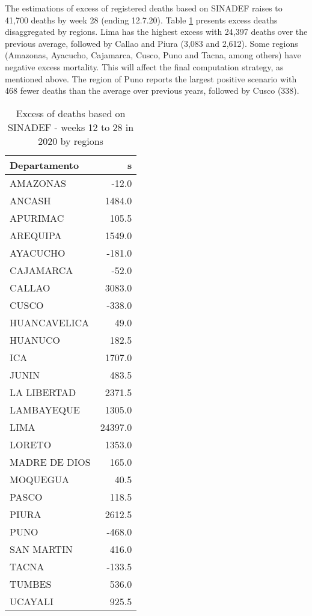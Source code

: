 \documentclass[
]{article}
\begin{document}
The estimations of excess of registered deaths based on SINADEF raises to 41,700 deaths by week 28 (ending 12.7.20). Table \ref{tab:excessreg} presents excess deaths disaggregated by regions. Lima has the highest excess with 24,397 deaths over the previous average, followed by Callao and Piura (3,083 and 2,612). Some regions (Amazonas, Ayacucho, Cajamarca, Cusco, Puno and Tacna, among others) have negative excess mortality. This will affect the final computation strategy, as mentioned above. The region of Puno reports the largest positive scenario with 468 fewer deaths than the average over previous years, followed by Cusco (338).

\begin{table}[!h]

\caption{\label{tab:excessreg}Excess of deaths based on SINADEF - weeks 12 to 28 in 2020 by regions}
\centering
\begin{tabular}[t]{lr}
\toprule
Departamento & s\\
\midrule
AMAZONAS & -12.0\\
ANCASH & 1484.0\\
APURIMAC & 105.5\\
AREQUIPA & 1549.0\\
AYACUCHO & -181.0\\
\addlinespace
CAJAMARCA & -52.0\\
CALLAO & 3083.0\\
CUSCO & -338.0\\
HUANCAVELICA & 49.0\\
HUANUCO & 182.5\\
\addlinespace
ICA & 1707.0\\
JUNIN & 483.5\\
LA LIBERTAD & 2371.5\\
LAMBAYEQUE & 1305.0\\
LIMA & 24397.0\\
\addlinespace
LORETO & 1353.0\\
MADRE DE DIOS & 165.0\\
MOQUEGUA & 40.5\\
PASCO & 118.5\\
PIURA & 2612.5\\
\addlinespace
PUNO & -468.0\\
SAN MARTIN & 416.0\\
TACNA & -133.5\\
TUMBES & 536.0\\
UCAYALI & 925.5\\
\bottomrule
\end{tabular}
\end{table}
\end{document}
